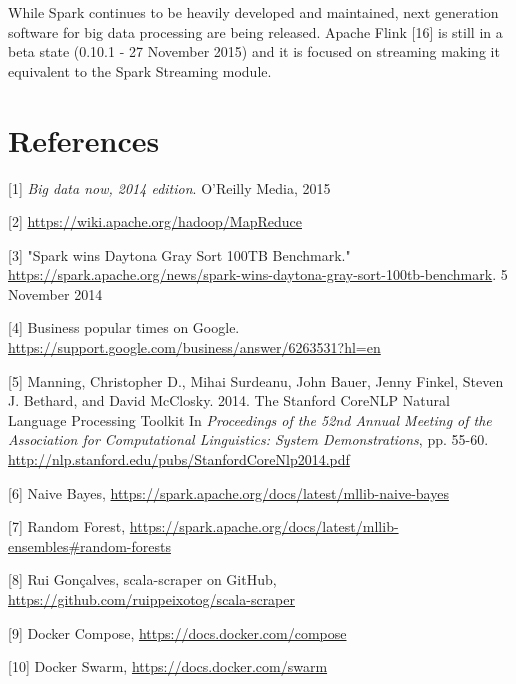\documentclass[11pt]{article}
\begin{document}
While \textsf{Spark} continues to be heavily developed and maintained, next generation software for big data processing are being released. \textsf{Apache Flink} [16] is still in a beta state (0.10.1 - 27 November 2015) and it is focused on streaming making it equivalent to the \textsf{Spark Streaming} module.

\section{References}



[1] \textit{Big data now, 2014 edition}. O'Reilly Media, 2015
\vspace{1pt}

[2] \url{https://wiki.apache.org/hadoop/MapReduce}
\vspace{1pt}

[3] "Spark wins Daytona Gray Sort 100TB Benchmark." \url{https://spark.apache.org/news/spark-wins-daytona-gray-sort-100tb-benchmark}. 5 November 2014
\vspace{1pt}

[4] Business popular times on Google. \url{https://support.google.com/business/answer/6263531?hl=en}
\vspace{1pt}

[5] Manning, Christopher D., Mihai Surdeanu, John Bauer, Jenny Finkel, Steven J. Bethard, and David McClosky. 2014. The Stanford CoreNLP Natural Language Processing Toolkit In \textit{Proceedings of the 52nd Annual Meeting of the Association for Computational Linguistics: System Demonstrations}, pp. 55-60. \url{http://nlp.stanford.edu/pubs/StanfordCoreNlp2014.pdf}
\vspace{1pt}

[6] Naive Bayes, \url{https://spark.apache.org/docs/latest/mllib-naive-bayes}
\vspace{1pt}

[7] Random Forest, \url{https://spark.apache.org/docs/latest/mllib-ensembles#random-forests}
\vspace{1pt}

[8] Rui Gonçalves, scala-scraper on GitHub, \url{https://github.com/ruippeixotog/scala-scraper}
\vspace{1pt}

[9] Docker Compose, \url{https://docs.docker.com/compose}
\vspace{1pt}

[10] Docker Swarm, \url{https://docs.docker.com/swarm}
\vspace{1pt}
\end{document}
